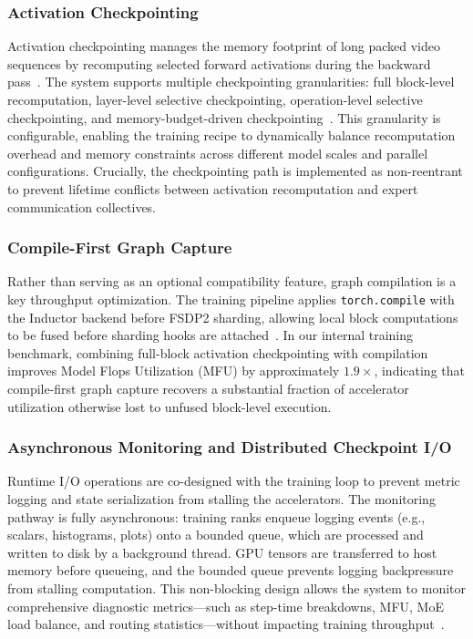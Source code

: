 \subsubsection{Activation Checkpointing}
Activation checkpointing manages the memory footprint of long packed video sequences by recomputing selected forward activations during the backward pass~\cite{chen2016training}.
The system supports multiple checkpointing granularities: full block-level recomputation, layer-level selective checkpointing, operation-level selective checkpointing, and memory-budget-driven checkpointing~\cite{korthikanti2022reducingactivationrecomputationlarge}.
This granularity is configurable, enabling the training recipe to dynamically balance recomputation overhead and memory constraints across different model scales and parallel configurations.
Crucially, the checkpointing path is implemented as non-reentrant to prevent lifetime conflicts between activation recomputation and expert communication collectives.

\subsubsection{Compile-First Graph Capture}
Rather than serving as an optional compatibility feature, graph compilation is a key throughput optimization.
The training pipeline applies \texttt{torch.compile} with the Inductor backend before FSDP2 sharding, allowing local block computations to be fused before sharding hooks are attached~\cite{ansel2024pytorch2}.
In our internal training benchmark, combining full-block activation checkpointing with compilation improves Model Flops Utilization (MFU) by approximately $1.9\times$, indicating that compile-first graph capture recovers a substantial fraction of accelerator utilization otherwise lost to unfused block-level execution.


\subsubsection{Asynchronous Monitoring and Distributed Checkpoint I/O}
Runtime I/O operations are co-designed with the training loop to prevent metric logging and state serialization from stalling the accelerators.
The monitoring pathway is fully asynchronous: training ranks enqueue logging events (e.g., scalars, histograms, plots) onto a bounded queue, which are processed and written to disk by a background thread.
GPU tensors are transferred to host memory before queueing, and the bounded queue prevents logging backpressure from stalling computation.
This non-blocking design allows the system to monitor comprehensive diagnostic metrics—such as step-time breakdowns, MFU, MoE load balance, and routing statistics—without impacting training throughput~\cite{moritz2018ray}.


